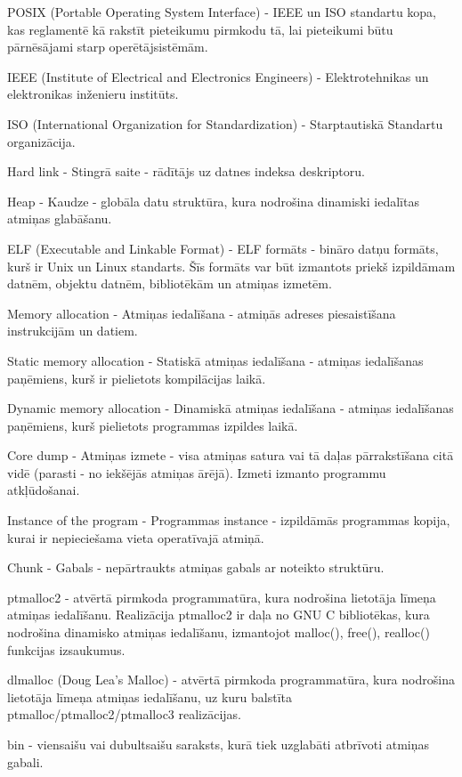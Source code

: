\noindent 

POSIX (Portable Operating System Interface) - IEEE un ISO standartu kopa,  kas reglamentē kā rakstīt pieteikumu pirmkodu tā, lai pieteikumi būtu pārnēsājami starp operētājsistēmām.

IEEE (Institute of Electrical and Electronics Engineers) - Elektrotehnikas un elektronikas inženieru institūts.

ISO (International Organization for Standardization) - Starptautiskā Standartu organizācija.

Hard link - Stingrā saite - rādītājs uz datnes indeksa deskriptoru. 

Heap - Kaudze - globāla datu struktūra,  kura  nodrošina dinamiski iedalītas atmiņas glabāšanu.

ELF (Executable and Linkable Format) - ELF formāts -  bināro datņu formāts, kurš ir Unix un Linux standarts. Šīs formāts var būt izmantots priekš izpildāmam datnēm, objektu datnēm, bibliotēkām un atmiņas izmetēm.

Memory allocation - Atmiņas iedalīšana - atmiņās adreses piesaistīšana instrukcijām un datiem.

Static memory allocation - Statiskā atmiņas iedalīšana -  atmiņas iedalīšanas paņēmiens, kurš ir pielietots kompilācijas laikā.

Dynamic memory allocation - Dinamiskā atmiņas iedalīšana - atmiņas iedalīšanas paņēmiens, kurš pielietots programmas izpildes laikā. 

Core dump - Atmiņas izmete - visa atmiņas satura vai tā daļas pārrakstīšana citā vidē (parasti - no iekšējās atmiņas ārējā). 
Izmeti izmanto programmu atkļūdošanai.

Instance of the program - Programmas instance - izpildāmās programmas kopija, kurai ir nepieciešama vieta operatīvajā atmiņā.

Chunk - Gabals - nepārtraukts atmiņas gabals ar noteikto struktūru.

ptmalloc2 - atvērtā pirmkoda programmatūra, kura nodrošina lietotāja līmeņa atmiņas iedalīšanu. Realizācija ptmalloc2 ir daļa no GNU C bibliotēkas, kura nodrošina dinamisko atmiņas iedalīšanu, izmantojot malloc(), free(), realloc() funkcijas izsaukumus.

dlmalloc (Doug Lea's Malloc) - atvērtā pirmkoda programmatūra, kura nodrošina lietotāja līmeņa atmiņas iedalīšanu, uz kuru balstīta ptmalloc/ptmalloc2/ptmalloc3 realizācijas.

bin - viensaišu vai dubultsaišu saraksts, kurā tiek uzglabāti atbrīvoti atmiņas gabali.

